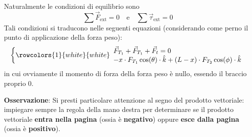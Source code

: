 \documentclass[a4paper]{extarticle}
\begin{document}
\noindent
Naturalmente le condizioni di equilibrio sono
\[\sum \vec F_{\text{ext}} = 0 \hspace{1em} \text{e} \hspace{1em} \sum \vec \tau_{\text{ext}} = 0\]
Tali condizioni si traducono nelle seguenti equazioni (considerando come perno il punto di applicazione della forza peso):
\[
  \left\{
  \rowcolors{1}{white}{white}
  \begin{array}{l}
    \vec F_{T_1} + \vec F_{T_1} + \vec F_t = 0\\
    -x \cdot F_{T_1} \cos(\theta) \cdot \hat{k} + (L-x) \cdot F_{T_2} \cos(\phi) \cdot \hat{k}\\
  \end{array}
  \right.
\]
in cui ovviamente il momento di forza della forza peso è nullo, essendo il braccio proprio $0$.

\vspace{1em}
\noindent
\textbf{Osservazione}: Si presti particolare attenzione al segno del prodotto vettoriale: impiegare sempre la regola della mano destra per determinare se il prodotto vettoriale \textbf{entra nella pagina} (ossia è \textbf{negativo}) oppure \textbf{esce dalla pagina} (ossia è \textbf{positivo}).
\end{document}
